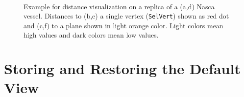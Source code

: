 \begin{figure}[!hbt]
	 \quad
	 \\
	\caption{ Example for distance visualization on a replica of a (a,d) Nasca vessel. Distances to
	          (b,e) a single vertex ({\tt SelVert}) shown as red dot and
	          (c,f) to a plane shown in light orange color.
	          Light colors mean high values and dark colors mean low values.
	}
	\label{fig:distanceexamples}
\end{figure}

\clearpage
\section{Storing and Restoring the Default View}
\label{sec:defaultviewset}

